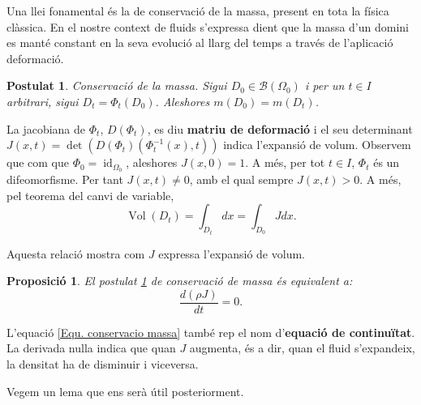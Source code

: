 \documentclass{article}
\numberwithin{equation}{section}
\DeclareMathOperator{\id}{id}
\DeclareMathOperator{\Vol}{Vol}
\newtheorem{proposicio}{Proposici\'{o}}[section]
\newtheorem{postulat}{Postulat}[section]
\begin{document}
Una llei fonamental \'{e}s la de conservaci\'{o} de la massa, present en tota la f\'{i}sica cl\`{a}ssica. En el nostre context de fluids s'expressa dient que la massa d'un domini es mant\'{e} constant en la seva evoluci\'{o} al llarg del temps a trav\'{e}s de l'aplicaci\'{o} deformaci\'{o}.

\begin{postulat}\label{Pos: conservacio massa}
Conservaci\'{o} de la massa. Sigui $D_0\in\mathcal{B}(\Omega_0)$ i per un $t\in I$ arbitrari, sigui $D_t=\Phi_t(D_0)$. Aleshores $m(D_0)=m(D_t)$.
\end{postulat}

La jacobiana de $\Phi_t$, $D(\Phi_t)$, es diu \textbf{matriu de deformaci\'{o}} i el seu determinant $J(x,t)=\det(D(\Phi_t)(\Phi_t^{-1}(x),t))$ indica l'expansi\'{o} de volum.
Observem que com que $\Phi_0=\id_{\Omega_0}$, aleshores $J(x,0)=1$. A m\'{e}s, per tot $t\in I$, $\Phi_t$ \'{e}s un difeomorfisme. Per tant $J(x,t)\neq0$, amb el qual sempre $J(x,t)>0$. A m\'{e}s, pel teorema del canvi de variable,
\[\Vol(D_t)=\int_{D_t}dx=\int_{D_0}Jdx.\]

Aquesta relaci\'{o} mostra com $J$ expressa l'expansi\'{o} de volum.

\begin{proposicio}\label{Pro: conservacio massa}
El postulat \ref{Pos: conservacio massa} de conservaci\'{o} de massa \'{e}s equivalent a:
\begin{equation}\label{Equ. conservacio massa}
\frac{d(\rho J)}{dt}=0.
\end{equation}
\end{proposicio}

L'equaci\'{o} \ref{Equ. conservacio massa} tamb\'{e} rep el nom d'\textbf{equaci\'{o} de continu\"{i}tat}. La derivada nul\textperiodcentered la indica que quan $J$ augmenta, \'{e}s a dir, quan el fluid s'expandeix, la densitat ha de disminuir i viceversa.

Vegem un lema que ens ser\`{a} \'{u}til posteriorment.
\end{document}
